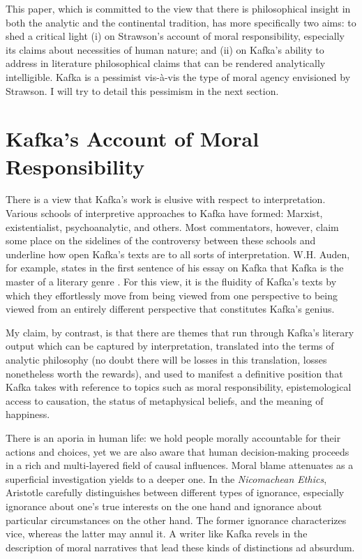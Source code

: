 \documentclass[11pt]{article}
\begin{document}
This paper, which is committed to the view that there is philosophical
insight in both the analytic and the continental tradition, has more
specifically two aims: to shed a critical light (i) on Strawson's
account of moral responsibility, especially its claims about
necessities of human nature; and (ii) on Kafka's ability to address in
literature philosophical claims that can be rendered analytically
intelligible. Kafka is a pessimist vis-{\`a}-vis the type of moral
agency envisioned by Strawson. I will try to detail this pessimism in
the next section.

\section{Kafka's Account of Moral Responsibility}
\label{section:kafka}

There is a view that Kafka's work is elusive with respect to
interpretation. Various schools of interpretive approaches to Kafka
have formed: Marxist, existentialist, psychoanalytic, and others. Most
commentators, however, claim some place on the sidelines of the
controversy between these schools and underline how open Kafka's texts
are to all sorts of interpretation. W.H. Auden, for example, states in
the first sentence of his essay on Kafka 
that Kafka is the master of a literary genre  .
For this view, it is the fluidity of Kafka's texts by which they
effortlessly move from being viewed from one perspective to being
viewed from an entirely different perspective that constitutes Kafka's
genius.

My claim, by contrast, is that there are themes that run through
Kafka's literary output which can be captured by interpretation,
translated into the terms of analytic philosophy (no doubt there will
be losses in this translation, losses nonetheless worth the rewards),
and used to manifest a definitive position that Kafka takes with
reference to topics such as moral responsibility, epistemological
access to causation, the status of metaphysical beliefs, and the
meaning of happiness.

There is an aporia in human life: we hold people morally accountable
for their actions and choices, yet we are also aware that human
decision-making proceeds in a rich and multi-layered field of causal
influences. Moral blame attenuates as a superficial investigation
yields to a deeper one. In the \emph{Nicomachean Ethics}, Aristotle
carefully distinguishes between different types of ignorance,
especially ignorance about one's true interests on the one hand and
ignorance about particular circumstances on the other hand. The former
ignorance characterizes vice, whereas the latter may annul it. A
writer like Kafka revels in the description of moral narratives that
lead these kinds of distinctions ad absurdum.
\end{document}
